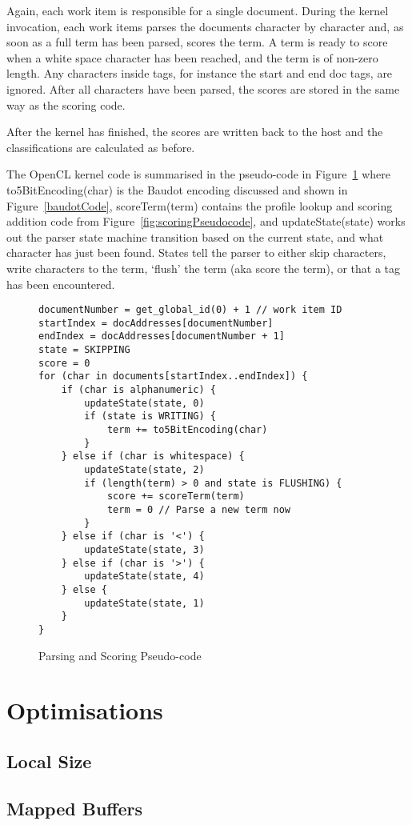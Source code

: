 Again, each work item is responsible for a single document. During the kernel
invocation, each work items parses the documents character by character and, as
soon as a full term has been parsed, scores the term. A term is ready to score
when a white space character has been reached, and the term is of non-zero
length. Any characters inside tags, for instance the start and end doc tags, are
ignored. After all characters have been parsed, the scores are stored in the
same way as the scoring code.

After the kernel has finished, the scores are written back to the host and the
classifications are calculated as before.

The OpenCL kernel code is summarised in the pseudo-code in
Figure~\ref{fig:parsingScoringPseudocode} where to5BitEncoding(char) is the
Baudot encoding discussed and shown in Figure~\ref{baudotCode}, scoreTerm(term)
contains the profile lookup and scoring addition code from
Figure~\ref{fig:scoringPseudocode}, and updateState(state) works out the parser
state machine transition based on the current state, and what character has just
been found. States tell the parser to either skip characters, write characters
to the term, `flush' the term (aka score the term), or that a tag has been
encountered.

\begin{figure}
\begin{verbatim}
documentNumber = get_global_id(0) + 1 // work item ID
startIndex = docAddresses[documentNumber]
endIndex = docAddresses[documentNumber + 1]
state = SKIPPING
score = 0
for (char in documents[startIndex..endIndex]) {
    if (char is alphanumeric) {
        updateState(state, 0)
        if (state is WRITING) {
            term += to5BitEncoding(char)
        }
    } else if (char is whitespace) {
        updateState(state, 2)
        if (length(term) > 0 and state is FLUSHING) {
            score += scoreTerm(term)
            term = 0 // Parse a new term now
        }
    } else if (char is '<') {
        updateState(state, 3)
    } else if (char is '>') {
        updateState(state, 4)
    } else {
        updateState(state, 1)
    }
}
\end{verbatim}
\caption{Parsing and Scoring Pseudo-code}
\label{fig:parsingScoringPseudocode}
\end{figure}

\section{Optimisations}

\subsection{Local Size}

\subsection{Mapped Buffers}
